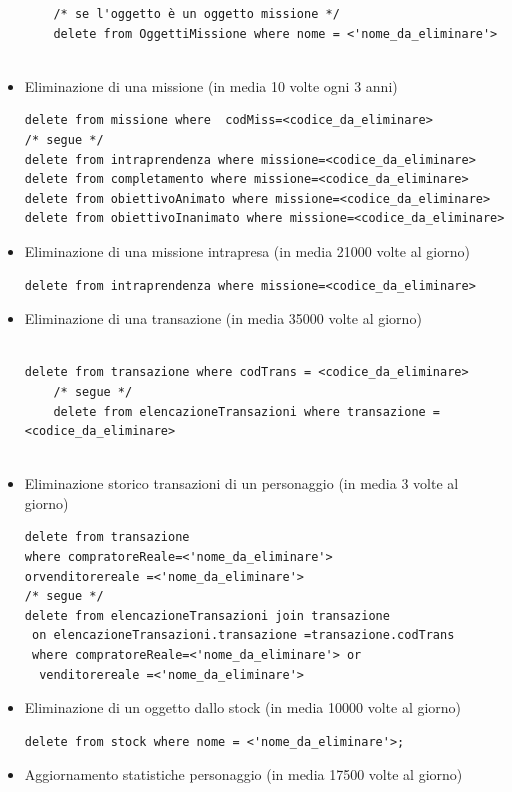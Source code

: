 \begin{itemize}
\begin{verbatim}
	/* se l'oggetto è un oggetto missione */
	delete from OggettiMissione where nome = <'nome_da_eliminare'>
	
	\end{verbatim}
\item Eliminazione di una missione (in media 10 volte ogni 3 anni)

\begin{verbatim}
delete from missione where  codMiss=<codice_da_eliminare>
/* segue */
delete from intraprendenza where missione=<codice_da_eliminare>
delete from completamento where missione=<codice_da_eliminare>
delete from obiettivoAnimato where missione=<codice_da_eliminare>
delete from obiettivoInanimato where missione=<codice_da_eliminare>

\end{verbatim}
\item Eliminazione di una missione intrapresa (in media 21000 volte al giorno)
\begin{verbatim}
delete from intraprendenza where missione=<codice_da_eliminare>

\end{verbatim}
\item Eliminazione di una transazione (in media 35000 volte al giorno)
\begin{verbatim}

delete from transazione where codTrans = <codice_da_eliminare>
	/* segue */
	delete from elencazioneTransazioni where transazione = <codice_da_eliminare>


\end{verbatim}
\item Eliminazione storico transazioni di un personaggio (in media 3 volte al giorno)

\begin{verbatim}
delete from transazione 
where compratoreReale=<'nome_da_eliminare'>
orvenditorereale =<'nome_da_eliminare'>
/* segue */
delete from elencazioneTransazioni join transazione
 on elencazioneTransazioni.transazione =transazione.codTrans
 where compratoreReale=<'nome_da_eliminare'> or
  venditorereale =<'nome_da_eliminare'>

\end{verbatim}
\item Eliminazione di un oggetto dallo stock (in media 10000 volte al giorno)
\begin{verbatim}
delete from stock where nome = <'nome_da_eliminare'>;

\end{verbatim}
\item Aggiornamento statistiche personaggio (in media 17500 volte al giorno) 


\end{itemize}
